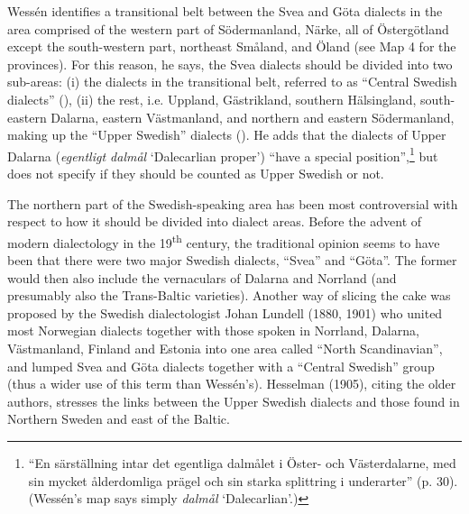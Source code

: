 Wessén identifies a transitional belt between the Svea and Göta dialects in the area comprised of the western part of Södermanland, Närke, all of Östergötland except the south-western part, northeast Småland, and Öland (see Map 4 for the provinces). For this reason, he says, the Svea dialects should be divided into two sub-areas: (i) the dialects in the transitional belt, referred to as “Central Swedish dialects” (), (ii) the rest, i.e. Uppland, Gästrikland, southern Hälsingland, south-eastern Dalarna, eastern Västmanland, and northern and eastern Södermanland, making up the “Upper Swedish” dialects (). He adds that the dialects of Upper Dalarna (\textit{egentligt dalmål} ‘Dalecarlian proper’) \label{bkm:wessenquote}“have a special position”,\footnote{\textsuperscript{ }“En särställning intar det egentliga dalmålet i Öster- och Västerdalarne, med sin mycket ålderdomliga prägel och sin starka splittring i underarter” (p. 30).  (Wessén’s map says simply \textit{dalmål} ‘Dalecarlian’.)} but does not specify if they should be counted as Upper Swedish or not.

The northern part of the Swedish-speaking area has been most controversial with respect to how it should be divided into dialect areas. Before the advent of modern dialectology in the 19\textsuperscript{th} century, the traditional opinion seems to have been that there were two major Swedish dialects, “Svea” and “Göta”. The former would then also include the vernaculars of Dalarna and Norrland (and presumably also the Trans-Baltic varieties). Another way of slicing the cake was proposed by the Swedish dialectologist Johan Lundell (1880, 1901) who united most Norwegian dialects together with those spoken in Norrland, Dalarna, Västmanland, Finland and Estonia into one area called “North Scandinavian”, and lumped Svea and Göta dialects together with a “Central Swedish” group (thus a wider use of this term than Wessén’s). Hesselman (1905), citing the older authors, stresses the links between the Upper Swedish dialects and those found in Northern Sweden and east of the Baltic. 


